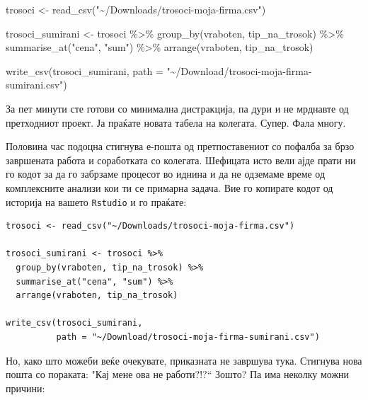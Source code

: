 \documentclass[
]{book}
\newenvironment{Shaded}{\begin{snugshade}}{\end{snugshade}}
\newcommand{\AttributeTok}[1]{\textcolor[rgb]{0.77,0.63,0.00}{#1}}
\newcommand{\FunctionTok}[1]{\textcolor[rgb]{0.00,0.00,0.00}{#1}}
\newcommand{\NormalTok}[1]{#1}
\newcommand{\OtherTok}[1]{\textcolor[rgb]{0.56,0.35,0.01}{#1}}
\newcommand{\SpecialCharTok}[1]{\textcolor[rgb]{0.00,0.00,0.00}{#1}}
\newcommand{\StringTok}[1]{\textcolor[rgb]{0.31,0.60,0.02}{#1}}
\begin{document}
\begin{Shaded}
\begin{Highlighting}[]
\NormalTok{trosoci }\OtherTok{\textless{}{-}} \FunctionTok{read\_csv}\NormalTok{(}\StringTok{"\textasciitilde{}/Downloads/trosoci{-}moja{-}firma.csv"}\NormalTok{)}

\NormalTok{trosoci\_sumirani }\OtherTok{\textless{}{-}}\NormalTok{ trosoci }\SpecialCharTok{\%\textgreater{}\%} 
  \FunctionTok{group\_by}\NormalTok{(vraboten, tip\_na\_trosok) }\SpecialCharTok{\%\textgreater{}\%} 
  \FunctionTok{summarise\_at}\NormalTok{(}\StringTok{"cena"}\NormalTok{, }\StringTok{"sum"}\NormalTok{) }\SpecialCharTok{\%\textgreater{}\%} 
  \FunctionTok{arrange}\NormalTok{(vraboten, tip\_na\_trosok)}

\FunctionTok{write\_csv}\NormalTok{(trosoci\_sumirani, }
          \AttributeTok{path =} \StringTok{"\textasciitilde{}/Download/trosoci{-}moja{-}firma{-}sumirani.csv"}\NormalTok{)}
\end{Highlighting}
\end{Shaded}

За пет минути сте готови со минимална дистракција, па дури и не мрднавте од претходниот проект. Ја праќате новата табела на колегата. Супер. Фала многу.

Половина час подоцна стигнува е-пошта од претпоставениот со пофалба за брзо завршената работа и соработката со колегата. Шефицата исто вели ајде прати ни го кодот за да го забрзаме процесот во иднина и да не одземаме време од комплексните анализи кои ти се примарна задача. Вие го копирате кодот од историја на вашето \texttt{Rstudio} и го праќате:

\begin{verbatim}
trosoci <- read_csv("~/Downloads/trosoci-moja-firma.csv")

trosoci_sumirani <- trosoci %>% 
  group_by(vraboten, tip_na_trosok) %>% 
  summarise_at("cena", "sum") %>% 
  arrange(vraboten, tip_na_trosok)

write_csv(trosoci_sumirani, 
          path = "~/Download/trosoci-moja-firma-sumirani.csv")
\end{verbatim}

Но, како што можеби веќе очекувате, приказната не завршува тука. Стигнува нова пошта со пораката: "Кај мене ова не работи?!?{}`` Зошто? Па има неколку можни причини:
\end{document}
